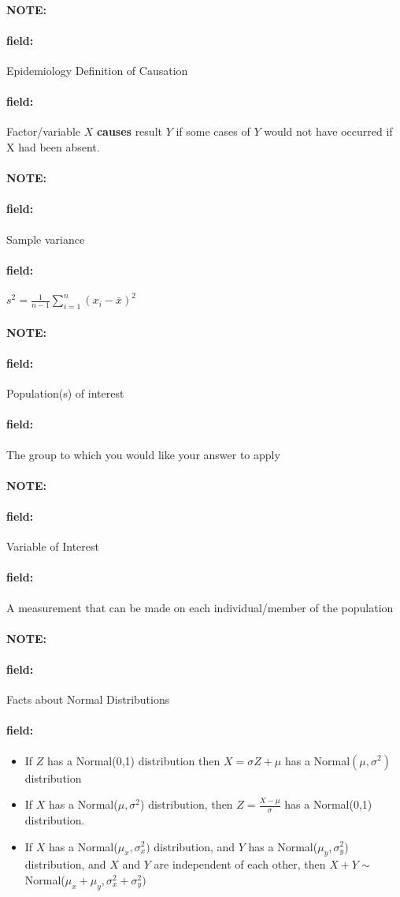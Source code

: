 \documentclass[12pt]{article}
\newenvironment{note}{\paragraph{NOTE:}}{}
\newenvironment{field}{\paragraph{field:}}{}
\begin{document}
\begin{note}
 \begin{field}
  Epidemiology Definition of Causation
 \end{field}
 \begin{field}
  Factor/variable $X$ \textbf{causes} result $Y$ if some cases of $Y$ would not have occurred if X had been absent.
 \end{field}
\end{note}

\begin{note}
 \begin{field}
  Sample variance
 \end{field}
 \begin{field}
  $s^2 = \frac{1}{n-1}\sum_{i=1}^n(x_i - \bar{x})^2$
 \end{field}
\end{note}

\begin{note}
 \begin{field}
  Population(s) of interest
 \end{field}
 \begin{field}
  The group to which you would like your answer to apply
 \end{field}
\end{note}

\begin{note}
 \begin{field}
  Variable of Interest
 \end{field}
 \begin{field}
  A measurement that can be made on each individual/member of the population
 \end{field}
\end{note}

\begin{note}
 \begin{field}
  Facts about Normal Distributions
 \end{field}
 \begin{field}
  \begin{itemize}
   \item If $Z$ has a Normal(0,1) distribution then $X = \sigma Z + \mu$ has a Normal$(\mu,\sigma^2)$ distribution
   \item If $X$ has a Normal($\mu,\sigma^2$) distribution, then $Z = \frac{X - \mu}{\sigma}$ has a Normal(0,1) distribution.
   \item If $X$ has a Normal($\mu_x,\sigma^2_x)$ distribution, and $Y$ has a Normal($\mu_y,\sigma_y^2$) distribution, and $X$ and $Y$ are independent of each other, then $X + Y \sim $ Normal($\mu_x + \mu_y, \sigma_x^2 + \sigma_y^2)$
  \end{itemize}
 \end{field}
\end{note}
\end{document}
